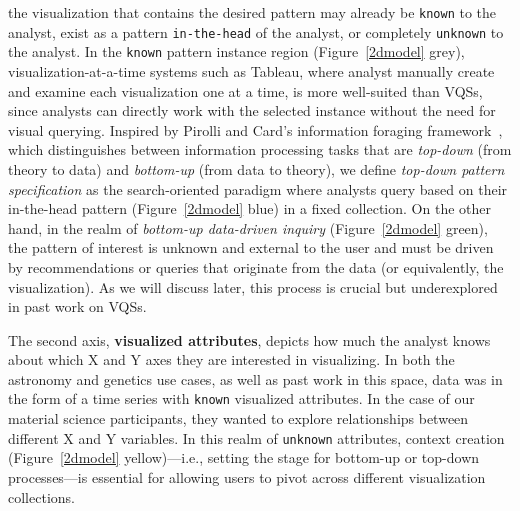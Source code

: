 the visualization that contains 
the desired pattern may already be \texttt{known} to the analyst, 
exist as a pattern \texttt{in-the-head} of the analyst, 
or completely \texttt{unknown} to the analyst. 
In the \texttt{known} pattern instance region (Figure~\ref{2dmodel} grey), visualization-at-a-time systems such as Tableau, 
where analyst manually create and examine each visualization one at a time, 
is more well-suited than VQSs, since analysts can directly work with the selected instance without the need for visual querying. 
Inspired by Pirolli and Card's information 
foraging framework~\cite{Pirolli}, which distinguishes 
between information processing tasks that are \textit{top-down} 
(from theory to data) and \textit{bottom-up} (from data to theory), 
we define \textit{top-down pattern specification} as the search-oriented paradigm where analysts query based on their 
in-the-head pattern (Figure~\ref{2dmodel} blue) in a fixed collection. 
On the other hand, in the realm of \textit{bottom-up 
data-driven inquiry} (Figure~\ref{2dmodel} green), 
the pattern of interest is unknown and external 
to the user and must be driven by recommendations 
or queries that originate from the data (or equivalently, the visualization). 
As we will discuss later, this process is crucial 
but underexplored in past work on VQSs.
\par The second axis, \textbf{visualized attributes}, 
depicts how much the analyst 
knows about which X and Y axes 
they are interested in visualizing. 
In both the astronomy and genetics use cases, 
as well as past work in this space, 
data was in the form of a time series 
with \texttt{known} visualized attributes. 
In the case of our material science participants, 
they wanted to explore relationships between different 
X and Y variables. 
In this realm of \texttt{unknown} attributes, 
context creation (Figure~\ref{2dmodel} yellow)---i.e.,
setting the stage for bottom-up or top-down processes---is 
essential for allowing users 
to pivot across different visualization collections.%

